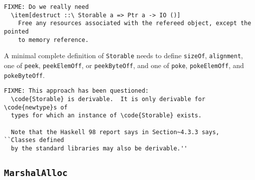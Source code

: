 \documentclass[a4paper,twosides]{article}
\newcommand{\code}[1]{\texttt{#1}}      %
\begin{document}
\begin{verbatim}
FIXME: Do we really need
  \item[destruct ::\ Storable a => Ptr a -> IO ()]
    Free any resources associated with the refereed object, except the pointed
    to memory reference.
\end{verbatim}

A minimal complete definition of \code{Storable} needs to define
\code{sizeOf}, \code{alignment}, one of \code{peek}, \code{peekElemOff}, or
\code{peekByteOff}, and one of \code{poke}, \code{pokeElemOff}, and
\code{pokeByteOff}.


\begin{verbatim}
FIXME: This approach has been questioned:
  \code{Storable} is derivable.  It is only derivable for \code{newtype}s of
  types for which an instance of \code{Storable} exists.

  Note that the Haskell 98 report says in Section~4.3.3 says, ``Classes defined
  by the standard libraries may also be derivable.''
\end{verbatim}

\subsection{\code{MarshalAlloc}}
\label{sec:MarshalAlloc}
\end{document}
